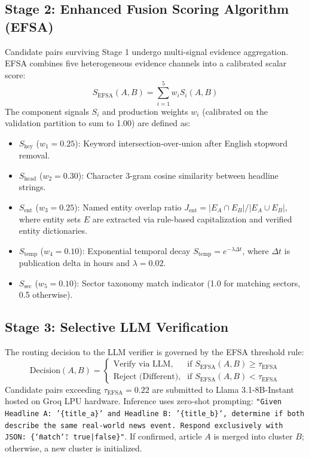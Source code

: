 \documentclass[conference]{IEEEtran}
\begin{document}
\subsection{Stage 2: Enhanced Fusion Scoring Algorithm (EFSA)}
Candidate pairs surviving Stage 1 undergo multi-signal evidence aggregation.
EFSA combines five heterogeneous evidence channels into a calibrated scalar score:
\begin{equation}
S_{\text{EFSA}}(A, B) = \sum_{i=1}^{5} w_i S_i(A, B)
\label{eq:efsa}
\end{equation}
The component signals $S_i$ and production weights $w_i$ (calibrated on the validation partition to sum to 1.00) are defined as:
\begin{itemize}
    \item $S_{\text{key}}$ ($w_1 = 0.25$): Keyword intersection-over-union after English stopword removal.
    \item $S_{\text{head}}$ ($w_2 = 0.30$): Character 3-gram cosine similarity between headline strings.
    \item $S_{\text{ent}}$ ($w_3 = 0.25$): Named entity overlap ratio $J_{\text{ent}} = |E_A \cap E_B| / |E_A \cup E_B|$, where entity sets $E$ are extracted via rule-based capitalization and verified entity dictionaries.
    \item $S_{\text{temp}}$ ($w_4 = 0.10$): Exponential temporal decay $S_{\text{temp}} = e^{-\lambda \Delta t}$, where $\Delta t$ is publication delta in hours and $\lambda = 0.02$.
    \item $S_{\text{sec}}$ ($w_5 = 0.10$): Sector taxonomy match indicator (1.0 for matching sectors, 0.5 otherwise).
\end{itemize}

\subsection{Stage 3: Selective LLM Verification}
The routing decision to the LLM verifier is governed by the EFSA threshold rule:
\begin{equation}
\text{Decision}(A, B) = \begin{cases} \text{Verify via LLM}, & \text{if } S_{\text{EFSA}}(A, B) \ge \tau_{\text{EFSA}} \\ \text{Reject (Different)}, & \text{if } S_{\text{EFSA}}(A, B) < \tau_{\text{EFSA}} \end{cases}
\label{eq:decision}
\end{equation}
Candidate pairs exceeding $\tau_{\text{EFSA}} = 0.22$ are submitted to Llama 3.1-8B-Instant hosted on Groq LPU hardware.
Inference uses zero-shot prompting:
\texttt{"Given Headline A: '\{title\_a\}' and Headline B: '\{title\_b\}', determine if both describe the same real-world news event. Respond exclusively with JSON: \{\char`\"{}match\char`\"{}: true|false\}"}.
If confirmed, article $A$ is merged into cluster $B$; otherwise, a new cluster is initialized.
\end{document}
